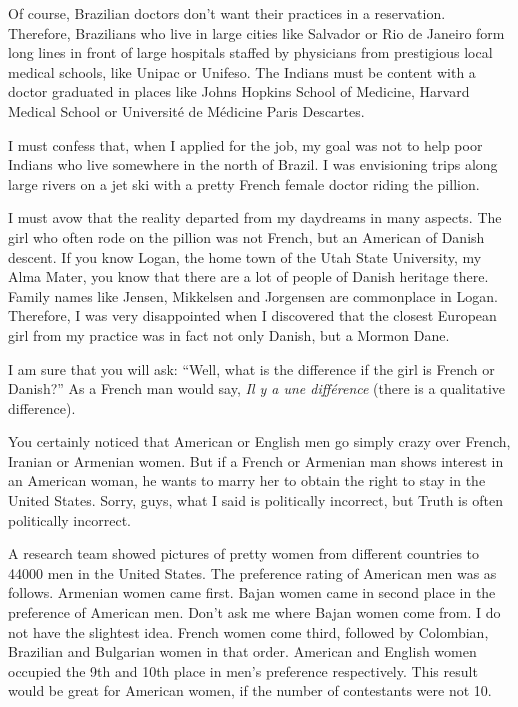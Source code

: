 \documentclass[
  12pt,
]{book}
\begin{document}
Of course, Brazilian doctors don't want their practices in a
reservation. Therefore, Brazilians who live in large cities like
Salvador or Rio de Janeiro form long lines in front of large hospitals
staffed by physicians from prestigious local medical schools, like
Unipac or Unifeso. The Indians must be content with a doctor graduated
in places like Johns Hopkins School of Medicine, Harvard Medical School
or Université de Médicine Paris Descartes.

I must confess that, when I applied for the job, my goal was not to help
poor Indians who live somewhere in the north of Brazil. I was
envisioning trips along large rivers on a jet ski with a pretty French
female doctor riding the pillion.

I must avow that the reality departed from my daydreams in many aspects.
The girl who often rode on the pillion was not French, but an American
of Danish descent. If you know Logan, the home town of the Utah State
University, my Alma Mater, you know that there are a lot of people of
Danish heritage there. Family names like Jensen, Mikkelsen and Jorgensen
are commonplace in Logan. Therefore, I was very disappointed when I
discovered that the closest European girl from my practice was in fact
not only Danish, but a Mormon Dane.

I am sure that you will ask: ``Well, what is the difference if the girl
is French or Danish?'' As a French man would say, \emph{Il y a une
différence} (there is a qualitative difference).

You certainly noticed that American or English men go simply crazy over
French, Iranian or Armenian women. But if a French or Armenian man shows
interest in an American woman, he wants to marry her to obtain the right
to stay in the United States. Sorry, guys, what I said is politically
incorrect, but Truth is often politically incorrect.

A research team showed pictures of pretty women from different countries
to 44000 men in the United States. The preference rating of American men
was as follows. Armenian women came first. Bajan women came in second
place in the preference of American men. Don't ask me where Bajan women
come from. I do not have the slightest idea. French women come third,
followed by Colombian, Brazilian and Bulgarian women in that order.
American and English women occupied the 9th and 10th place in men's
preference respectively. This result would be great for American women,
if the number of contestants were not 10.
\end{document}
